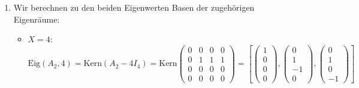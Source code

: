 \begin{enumerate}
	 \item Wir berechnen zu den beiden Eigenwerten Basen der zugehörigen Eigenräume:
	 	\begin{itemize}
	 		\item \( X = 4 \): \( \text{Eig}(A_2, 4) = \text{Kern}(A_2 - 4 I_4) = \text{Kern}\begin{pmatrix}
	 			0 & 0 & 0 & 0 \\
	 			0 & 1 & 1 & 1 \\
	 			0 & 0 & 0 & 0 \\
	 			0 & 0 & 0 & 0
	 		\end{pmatrix} = \left [  \begin{pmatrix}
	 			1 \\ 0 \\ 0 \\ 0 
	 		\end{pmatrix}, \begin{pmatrix}
	 			0 \\ 1 \\ -1 \\ 0 
	 		\end{pmatrix}, \begin{pmatrix}
	 			0 \\ 1 \\ 0 \\ -1
	 		\end{pmatrix} \right ] \)


\end{itemize}
\end{enumerate}

